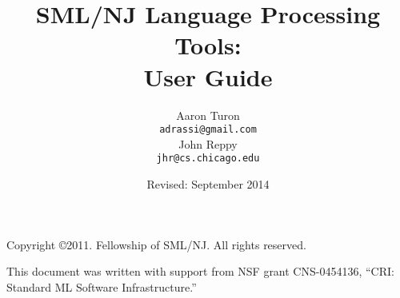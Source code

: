 \documentclass[11pt,letterpaper]{book}
\title{
  SML/NJ Language Processing Tools:\\
  User Guide}
\author{
  Aaron Turon\\
  \texttt{adrassi@gmail.com}\\[0.5em]
  John Reppy\\
  \texttt{jhr@cs.chicago.edu}}
\date{Revised: September 2014}
\begin{document}
\frontmatter

	\maketitle
	
	\phantom{.}
	
	\noindent Copyright \copyright{}2011.  Fellowship of SML/NJ.  All rights reserved.
	
	\vskip 12pt
	\noindent This document was written with support from NSF grant CNS-0454136, ``CRI: Standard ML Software Infrastructure.''
	
	\pagebreak
	
	\tableofcontents

\mainmatter


	\newpage

	
	

	
		
		
		
		
		
	
%	
%		
%		


%		
%		


%	
%	
\end{document}
